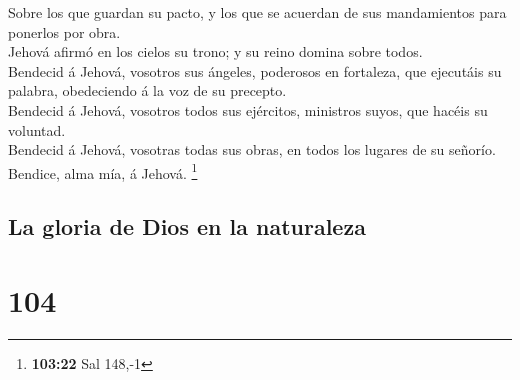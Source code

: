 Sobre los que guardan su pacto, y los que se acuerdan de
sus mandamientos para ponerlos por obra.\\
 Jehová afirmó en los cielos su trono; y su reino domina
sobre todos.\\
 Bendecid á Jehová, vosotros sus ángeles, poderosos en
fortaleza, que ejecutáis su palabra, obedeciendo á la voz de su
precepto.\\
 Bendecid á Jehová, vosotros todos sus ejércitos, ministros
suyos, que hacéis su voluntad.\\
 Bendecid á Jehová, vosotras todas sus obras, en todos los
lugares de su señorío. Bendice, alma mía, á Jehová. \footnote{\textbf{103:22}
  Sal 148,-1}

\hypertarget{la-gloria-de-dios-en-la-naturaleza}{%
\subsection{La gloria de Dios en la
naturaleza}\label{la-gloria-de-dios-en-la-naturaleza}}

\hypertarget{section-103}{%
\section{104}\label{section-103}}

